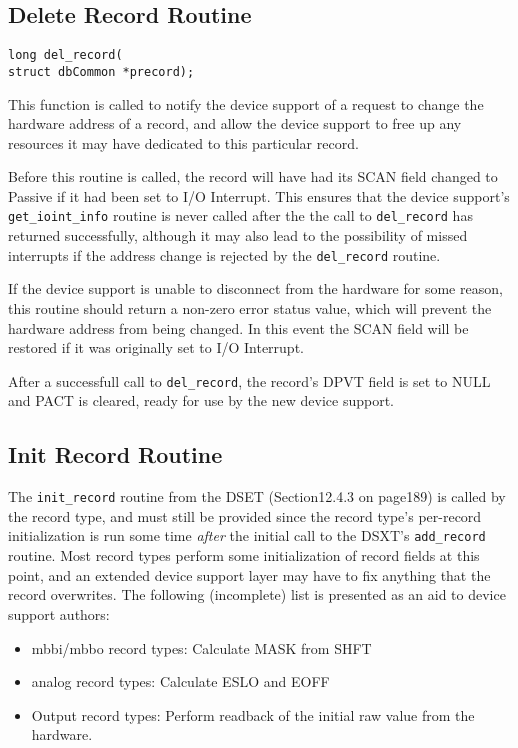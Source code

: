 \subsection{Delete Record Routine}

\begin{verbatim}long del_record(
struct dbCommon *precord);
\end{verbatim}This function is called to notify the device support of a request to change the hardware address of a record, and allow the 
device support to free up any resources it may have dedicated to this particular record.

Before this routine is called, the record will have had its SCAN field changed to Passive if it had been set to I/O Interrupt. 
This ensures that the device support's \verb|get_ioint_info| routine is never called after the the call to \verb|del_record| has 
returned successfully, although it may also lead to the possibility of missed interrupts if the address change is rejected by 
the \verb|del_record| routine.

If the device support is unable to disconnect from the hardware for some reason, this routine should return a non-zero 
error status value, which will prevent the hardware address from being changed. In this event the SCAN field will be 
restored if it was originally set to I/O Interrupt.

After a successfull call to \verb|del_record|, the record's DPVT field is set to NULL and PACT is cleared, ready for use by 
the new device support.

\subsection{Init Record Routine}

The \verb|init_record| routine from the DSET (Section12.4.3 on page189) is called by the record type, and must still be 
provided since the record type's per-record initialization is run some time \emph{after} the initial call to the DSXT's 
\verb|add_record| routine. Most record types perform some initialization of record fields at this point, and an extended device 
support layer may have to fix anything that the record overwrites. The following (incomplete) list is presented as an aid to 
device support authors:

\begin{itemize}\item mbbi/mbbo record types: Calculate MASK from SHFT

\item analog record types: Calculate ESLO and EOFF

\item Output record types: Perform readback of the initial raw value from the hardware.

\end{itemize}








